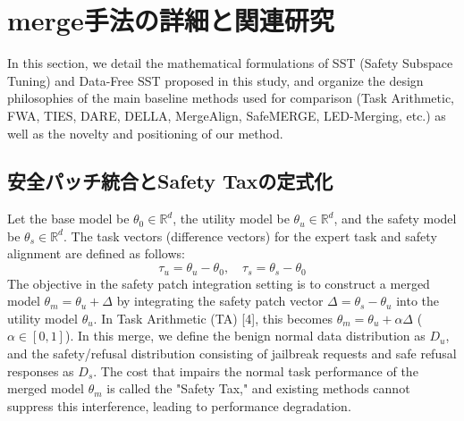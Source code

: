 \documentclass{article}
\begin{document}
\section{merge手法の詳細と関連研究}
\label{app:merge手法の詳細と関連研究}

In this section, we detail the mathematical formulations of SST (Safety Subspace Tuning) and Data-Free SST proposed in this study, and organize the design philosophies of the main baseline methods used for comparison (Task Arithmetic, FWA, TIES, DARE, DELLA, MergeAlign, SafeMERGE, LED-Merging, etc.) as well as the novelty and positioning of our method.

\subsection{安全パッチ統合とSafety Taxの定式化}

Let the base model be $\theta_0 \in \mathbb{R}^d$, the utility model be $\theta_u \in \mathbb{R}^d$, and the safety model be $\theta_s \in \mathbb{R}^d$. The task vectors (difference vectors) for the expert task and safety alignment are defined as follows:
\[ \tau_u = \theta_u - \theta_0, \quad \tau_s = \theta_s - \theta_0 \]
The objective in the safety patch integration setting is to construct a merged model $\theta_m = \theta_u + \Delta$ by integrating the safety patch vector $\Delta = \theta_s - \theta_u$ into the utility model $\theta_u$. In Task Arithmetic (TA) [4], this becomes $\theta_m = \theta_u + \alpha \Delta$ ($\alpha \in [0, 1]$).
In this merge, we define the benign normal data distribution as $D_u$, and the safety/refusal distribution consisting of jailbreak requests and safe refusal responses as $D_s$. The cost that impairs the normal task performance of the merged model $\theta_m$ is called the "Safety Tax," and existing methods cannot suppress this interference, leading to performance degradation.
\end{document}
